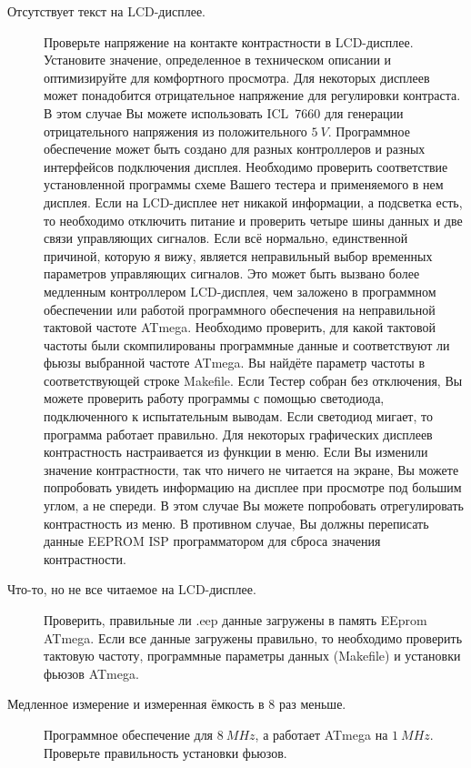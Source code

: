 \begin{description}
\item[Отсутствует текст на LCD-дисплее.]
Проверьте напряжение на контакте контрастности в LCD-дисплее. Установите значение, определенное в техническом описании
и оптимизируйте для комфортного просмотра. Для некоторых дисплеев может понадобится отрицательное напряжение для
регулировки контраста. В этом случае Вы можете использовать ICL~7660 для генерации отрицательного напряжения из 
положительного \(5~V\).
Программное обеспечение может быть создано для разных контроллеров и разных интерфейсов подключения
дисплея. Необходимо проверить соответствие установленной программы схеме Вашего тестера и применяемого в нем дисплея.   
Если на LCD-дисплее нет никакой информации, а подсветка есть, то необходимо отключить питание и проверить четыре шины данных 
и две связи управляющих сигналов. Если всё нормально, единственной причиной, которую я вижу, является неправильный 
выбор временных параметров управляющих сигналов. Это может быть вызвано более медленным контроллером LCD-дисплея, чем 
заложено в программном обеспечении или работой программного обеспечения на неправильной тактовой частоте ATmega. 
Необходимо проверить, для какой тактовой частоты были скомпилированы программные данные и соответствуют ли фьюзы 
выбранной частоте ATmega. Вы найдёте параметр частоты в соответствующей строке Makefile. Если Тестер собран без 
отключения, Вы можете проверить работу программы с помощью светодиода, подключенного к испытательным выводам. 
Если светодиод мигает, то программа работает правильно.
Для некоторых графических дисплеев контрастность настраивается из функции в меню. 
Если Вы изменили значение контрастности, так что ничего не читается на экране, Вы можете попробовать увидеть 
информацию на дисплее при просмотре под большим углом, а не спереди. В этом случае Вы можете попробовать 
отрегулировать контрастность из меню. В противном случае, Вы должны переписать данные EEPROM ISP программатором 
для сброса значения контрастности.

\item[Что-то, но не все читаемое на LCD-дисплее.]
Проверить, правильные ли .eep данные загружены в память EEprom  ATmega. Если все данные загружены правильно, 
то необходимо проверить тактовую частоту, программные параметры данных (Makefile) и установки фьюзов ATmega.

\item[Медленное измерение и измеренная ёмкость в 8 раз меньше.] 
Программное обеспечение для \(8~MHz\), а работает ATmega на \(1~MHz\). Проверьте правильность установки фьюзов.


\end{description}
